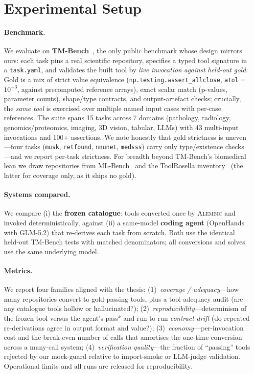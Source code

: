 \section{Experimental Setup}

\paragraph{Benchmark.}
We evaluate on \textbf{TM-Bench}~\citep{wolflein2025toolmaker_acl}, the only
public benchmark whose design mirrors ours: each task pins a real scientific
repository, specifies a typed tool signature in a \texttt{task.yaml}, and
validates the built tool by \emph{live invocation against held-out gold}. Gold
is a mix of strict value equivalence
(\texttt{np.testing.assert\_allclose}, \texttt{atol}$=$$10^{-3}$, against
precomputed reference arrays), exact scalar match (p-values, parameter counts),
shape/type contracts, and output-artefact checks; crucially, the \emph{same
tool} is exercised over multiple named input cases with per-case references. The
suite spans 15 tasks across 7 domains (pathology, radiology, genomics/proteomics,
imaging, 3D vision, tabular, LLMs) with 43 multi-input invocations and 100+
assertions. We note honestly that gold strictness is uneven---four tasks
(\texttt{musk}, \texttt{retfound}, \texttt{nnunet}, \texttt{medsss}) carry only
type/existence checks---and we report per-task strictness. For breadth beyond
TM-Bench's biomedical lean we draw repositories from
ML-Bench~\citep{tang2024mlbench} and the ToolRosella
inventory~\citep{toolrosella2026} (the latter for coverage only, as it ships no
gold).

\paragraph{Systems compared.}
We compare (i) the \textbf{frozen catalogue}: tools converted once by
\textsc{Alembic} and invoked deterministically, against (ii) a same-model
\textbf{coding agent} (OpenHands with GLM-5.2) that re-derives each task from
scratch. Both use the identical held-out TM-Bench tests with matched
denominators; all conversions and solves use the same underlying model.

\paragraph{Metrics.}
We report four families aligned with the thesis:
(1)~\emph{coverage / adequacy}---how many repositories convert to gold-passing
tools, plus a tool-adequacy audit (are any catalogue tools hollow or
hallucinated?);
(2)~\emph{reproducibility}---determinism of the frozen tool versus the agent's
pass$^k$ and run-to-run \emph{contract drift} (do repeated re-derivations agree
in output format and value?);
(3)~\emph{economy}---per-invocation cost and the break-even number of calls that
amortises the one-time conversion across a many-call system;
(4)~\emph{verification quality}---the fraction of ``passing'' tools rejected by
our mock-guard relative to import-smoke or LLM-judge validation.
Operational limits and all runs are released for reproducibility.
